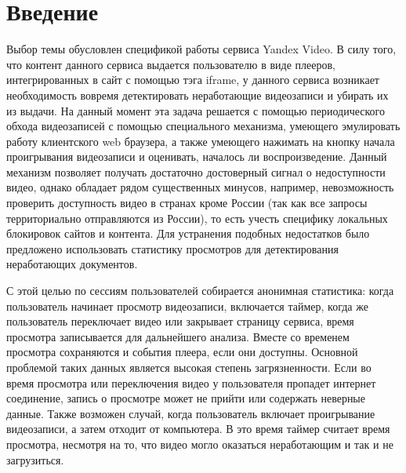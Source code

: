 




\chapter{Введение}

Выбор темы обусловлен спецификой работы сервиса Yandex Video. В силу того, что контент данного сервиса выдается пользователю в виде плееров, интегрированных в сайт с помощью тэга iframe, у данного сервиса возникает необходимость вовремя детектировать неработающие видеозаписи и убирать их из выдачи. На данный момент эта задача решается с помощью периодического обхода видеозаписей с помощью специального механизма, умеющего эмулировать работу клиентского web браузера, а также умеющего нажимать на кнопку начала проигрывания видеозаписи и оценивать, началось ли воспроизведение. Данный механизм позволяет получать достаточно достоверный сигнал о недоступности видео, однако обладает рядом существенных минусов, например, невозможность проверить доступность видео в странах кроме России (так как все запросы территориально отправляются из России), то есть учесть специфику локальных блокировок сайтов и контента. Для устранения подобных недостатков было предложено использовать статистику просмотров для детектирования неработающих документов.

С этой целью по сессиям пользователей собирается анонимная статистика: когда пользователь начинает просмотр видеозаписи, включается таймер, когда же пользователь переключает видео или закрывает страницу сервиса, время просмотра записывается для дальнейшего анализа. Вместе со временем просмотра сохраняются и события плеера, если они доступны. Основной проблемой таких данных является высокая степень загрязненности. Если во время просмотра или переключения видео у пользователя пропадет интернет соединение, запись о просмотре может не прийти или содержать неверные данные. Также возможен случай, когда пользователь включает проигрывание видеозаписи, а затем отходит от компьютера. В это время таймер считает время просмотра, несмотря на то, что видео могло оказаться неработающим и так и не загрузиться.

